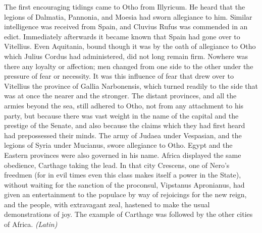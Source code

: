 
The first encouraging tidings came to Otho from Illyricum. He heard that the legions of Dalmatia, Pannonia, and Moesia had sworn allegiance to him. Similar intelligence was received from Spain, and Cluvius Rufus was commended in an edict. Immediately afterwards it became known that Spain had gone over to Vitellius. Even Aquitania, bound though it was by the oath of allegiance to Otho which Julius Cordus had administered, did not long remain firm. Nowhere was there any loyalty or affection; men changed from one side to the other under the pressure of fear or necessity. It was this influence of fear that drew over to Vitellius the province of Gallia Narbonensis, which turned readily to the side that was at once the nearer and the stronger. The distant provinces, and all the armies beyond the sea, still adhered to Otho, not from any attachment to his party, but because there was vast weight in the name of the capital and the prestige of the Senate, and also because the claims which they had first heard had prepossessed their minds. The army of Judaea under Vespasian, and the legions of Syria under Mucianus, swore allegiance to Otho. Egypt and the Eastern provinces were also governed in his name. Africa displayed the same obedience, Carthage taking the lead. In that city Crescens, one of Nero's freedmen (for in evil times even this class makes itself a power in the State), without waiting for the sanction of the proconsul, Vipstanus Apronianus, had given an entertainment to the populace by way of rejoicings for the new reign, and the people, with extravagant zeal, hastened to make the usual demonstrations of joy. The example of Carthage was followed by the other cities of Africa. \emph{(Latin)}


